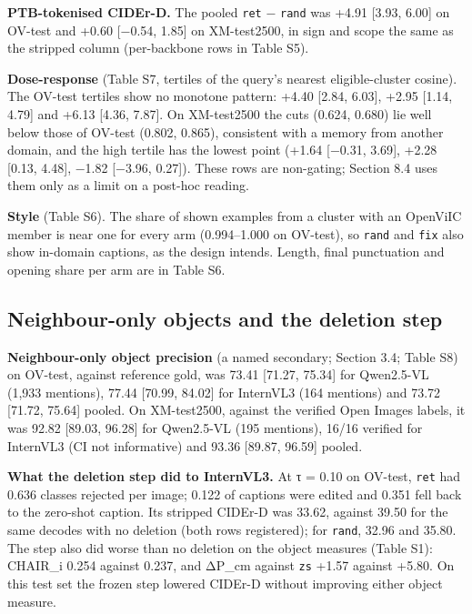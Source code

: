\documentclass[manuscript,screen]{acmart}
\begin{document}
\textbf{PTB-tokenised CIDEr-D.} The pooled \texttt{ret} − \texttt{rand} was +4.91 {[}3.93, 6.00{]}
on OV-test and +0.60 {[}−0.54, 1.85{]} on XM-test2500, in sign and scope the same as the stripped
column (per-backbone rows in Table S5).

\textbf{Dose-response} (Table S7, tertiles of the query's nearest eligible-cluster cosine). The
OV-test tertiles show no monotone pattern: +4.40 {[}2.84, 6.03{]}, +2.95 {[}1.14, 4.79{]} and +6.13
{[}4.36, 7.87{]}. On XM-test2500 the cuts (0.624, 0.680) lie well below those of OV-test (0.802,
0.865), consistent with a memory from another domain, and the high tertile has the lowest point
(+1.64 {[}−0.31, 3.69{]}, +2.28 {[}0.13, 4.48{]}, −1.82 {[}−3.96, 0.27{]}). These rows are
non-gating; Section 8.4 uses them only as a limit on a post-hoc reading.

\textbf{Style} (Table S6). The share of shown examples from a cluster with an OpenViIC member is
near one for every arm (0.994--1.000 on OV-test), so \texttt{rand} and \texttt{fix} also show
in-domain captions, as the design intends. Length, final punctuation and opening share per arm are
in Table S6.

\subsection{Neighbour-only objects and the deletion
step}\label{neighbour-only-objects-and-the-deletion-step-1}

\textbf{Neighbour-only object precision} (a named secondary; Section 3.4; Table S8) on OV-test,
against reference gold, was 73.41 {[}71.27, 75.34{]} for Qwen2.5-VL (1,933 mentions), 77.44
{[}70.99, 84.02{]} for InternVL3 (164 mentions) and 73.72 {[}71.72, 75.64{]} pooled. On XM-test2500,
against the verified Open Images labels, it was 92.82 {[}89.03, 96.28{]} for Qwen2.5-VL (195
mentions), 16/16 verified for InternVL3 (CI not informative) and 93.36 {[}89.87, 96.59{]} pooled.

\textbf{What the deletion step did to InternVL3.} At τ = 0.10 on OV-test, \texttt{ret} had 0.636
classes rejected per image; 0.122 of captions were edited and 0.351 fell back to the zero-shot
caption. Its stripped CIDEr-D was 33.62, against 39.50 for the same decodes with no deletion (both
rows registered); for \texttt{rand}, 32.96 and 35.80. The step also did worse than no deletion on
the object measures (Table S1): CHAIR\_i 0.254 against 0.237, and ΔP\_cm against \texttt{zs} +1.57
against +5.80. On this test set the frozen step lowered CIDEr-D without improving either object
measure.
\end{document}
